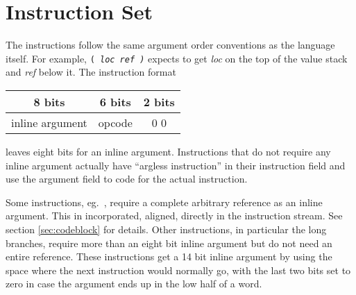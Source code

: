 \section{Instruction Set}
The instructions follow the same argument order conventions as the
language itself.  For example, {\tt ( \em loc ref \tt)}
expects to get {\em loc} on the top of the value stack and {\em ref}
below it.  The instruction format
\begin{center} \begin{tabular}{|c|c|c|}\hline
 8 bits          & 6 bits & 2 bits \\\hline
 inline argument & opcode & 0 0    \\\hline
\end{tabular} \end{center}
leaves eight bits for an inline argument.  Instructions that do not
require any inline argument actually have ``argless instruction'' in
their instruction field and use the argument field to code for the
actual instruction.

Some instructions, eg.\ , require a complete arbitrary
reference as an inline argument.  This in incorporated, aligned,
directly in the instruction stream.  See section \ref{sec:codeblock}
for details.  Other instructions, in particular the long branches,
require more than an eight bit inline argument but do not need an
entire reference.  These instructions get a 14 bit inline argument by
using the space where the next instruction would normally go, with the
last two bits set to zero in case the argument ends up in the low half
of a word.

\newenvironment{itable}[1]{
\begin{center} \par \nopagebreak #1 \par \nopagebreak
\begin{tabular}{|l|c|l|l|l|} \hline
{\em instruction} & {\em inline arg} & {\em initial stack}
 & {\em final stack} & {\em extra cell args}
\\\hline\hline}{\hline\end{tabular}\end{center}}

\newcommand{\icomment}[1]{\multicolumn{5}{|l|}{\parbox{4in}{#1}}\\\hline}

